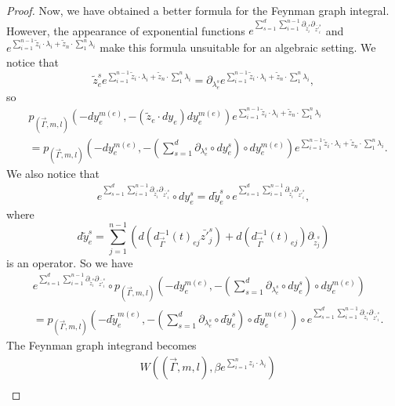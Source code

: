 \documentclass[11pt]{amsart}
\theoremstyle{definition}
\theoremstyle{remark}
\numberwithin{equation}{section}
\begin{document}
\begin{proof}
    Now, we have obtained a better formula for the Feynman graph integral. However, the appearance of exponential functions $e^{\sum_{s=1}^{d}\sum_{i=1}^{n-1}\partial_{\tilde{z}_{i}^{s}}\partial_{\bar{z'}_{i}^{s}}}$ and $e^{\sum_{i=1}^{n-1}\tilde{z}_{i}\cdot\lambda_{i}+\tilde{z}_{n}\cdot\sum_{1}^{n}\lambda_{i}}$ make this formula unsuitable for an algebraic setting. We notice that
    $$
    \tilde{z}^{s}_{e}e^{\sum_{i=1}^{n-1}\tilde{z}_{i}\cdot\lambda_{i}+\tilde{z}_{n}\cdot\sum_{1}^{n}\lambda_{i}}=\partial_{\lambda_{e}^{s}}e^{\sum_{i=1}^{n-1}\tilde{z}_{i}\cdot\lambda_{i}+\tilde{z}_{n}\cdot\sum_{1}^{n}\lambda_{i}},
    $$
    so 
    \begin{align*}
        &p_{(\vec{\Gamma},m,l)}(-dy_{e}^{m(e)},-(\tilde{z}_{e}\cdot dy_{e})dy_{e}^{m(e)})e^{\sum_{i=1}^{n-1}\tilde{z}_{i}\cdot\lambda_{i}+\tilde{z}_{n}\cdot\sum_{1}^{n}\lambda_{i}}\\
        &=
        p_{(\vec{\Gamma},m,l)}(-dy_{e}^{m(e)},-(\sum_{s=1}^{d}\partial_{\lambda_{e}^{s}}\circ dy_{e}^{s})\circ dy_{e}^{m(e)})e^{\sum_{i=1}^{n-1}\tilde{z}_{i}\cdot\lambda_{i}+\tilde{z}_{n}\cdot\sum_{1}^{n}\lambda_{i}}.
    \end{align*}
    We also notice that
    \begin{align*}
        e^{\sum_{s=1}^{d}\sum_{i=1}^{n-1}\partial_{\tilde{z}_{i}^{s}}\partial_{\bar{z'}_{i}^{s}}}\circ dy_{e}^{s}=d\tilde{y}_{e}^{s}\circ
        e^{\sum_{s=1}^{d}\sum_{i=1}^{n-1}\partial_{\tilde{z}_{i}^{s}}\partial_{\bar{z'}_{i}^{s}}},
    \end{align*}
    where 
    $$
    d\tilde{y}_{e}^{s}=\sum_{j=1}^{n-1}\left(
        d\left(d^{-1}_{\vec{\Gamma}}(t)_{ej}\bar{z'}_{j}^{s}\right)+d\left(d^{-1}_{\vec{\Gamma}}(t)_{ej}\right)\partial_{\tilde{z}_{j}^{s}}
        \right)
    $$
    is an operator. So we have
    \begin{align*}
        &e^{\sum_{s=1}^{d}\sum_{i=1}^{n-1}\partial_{\tilde{z}_{i}^{s}}\partial_{\bar{z'}_{i}^{s}}}\circ
        p_{(\vec{\Gamma},m,l)}(-dy_{e}^{m(e)},-(\sum_{s=1}^{d}\partial_{\lambda_{e}^{s}}\circ dy_{e}^{s})\circ dy_{e}^{m(e)})\\
        &=
        p_{(\vec{\Gamma},m,l)}(-d\tilde{y}_{e}^{m(e)},-(\sum_{s=1}^{d}\partial_{\lambda_{e}^{s}}\circ d\tilde{y}_{e}^{s})\circ d\tilde{y}_{e}^{m(e)})\circ 
        e^{\sum_{s=1}^{d}\sum_{i=1}^{n-1}\partial_{\tilde{z}_{i}^{s}}\partial_{\bar{z'}_{i}^{s}}}.
    \end{align*}
    The Feynman graph integrand becomes
    \begin{align*}
        &W((\vec{\Gamma},m,l),\beta e^{\sum_{i=1}^{n}z_{i}\cdot\lambda_{i}})\\

\end{align*}
\end{proof}
\end{document}
